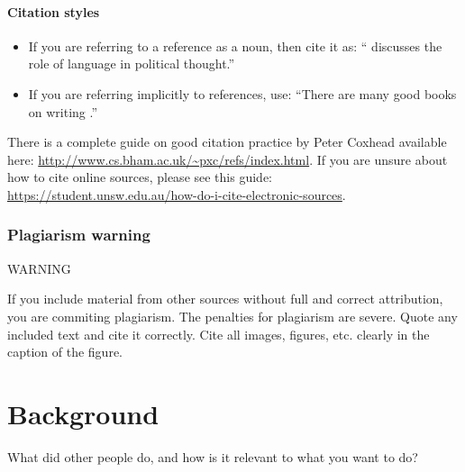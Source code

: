 \documentclass{l4proj}
\begin{document}
\subsubsection{Citation styles}

\begin{itemize}
\item If you are referring to a reference as a noun, then cite it as: ``\citet{Orw68} discusses the role of language in political thought.''
\item If you are referring implicitly to references, use: ``There are many good books on writing \citep{Orw68, Wil09, Pin15}.''
\end{itemize}

There is a complete guide on good citation practice by Peter Coxhead available here: \url{http://www.cs.bham.ac.uk/~pxc/refs/index.html}. 
If you are unsure about how to cite online sources, please see this guide: \url{https://student.unsw.edu.au/how-do-i-cite-electronic-sources}.

\subsection{Plagiarism warning}

\begin{highlight_title}{WARNING}
    
    If you include material from other sources without full and correct attribution, you are commiting plagiarism. The penalties for plagiarism are severe.
    Quote any included text and cite it correctly. Cite all images, figures, etc. clearly in the caption of the figure.
\end{highlight_title}


\chapter{Background}
What did other people do, and how is it relevant to what you want to do?
\end{document}
